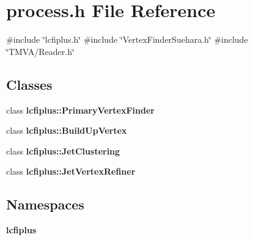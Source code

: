 \section{process.\+h File Reference}
\label{process_8h}
{\ttfamily \#include \char`\"{}lcfiplus.\+h\char`\"{}}\newline
{\ttfamily \#include \char`\"{}Vertex\+Finder\+Suehara.\+h\char`\"{}}\newline
{\ttfamily \#include \char`\"{}T\+M\+V\+A/\+Reader.\+h\char`\"{}}\newline
\subsection*{Classes}
\begin{DoxyCompactItemize}
\item 
class \textbf{ lcfiplus\+::\+Primary\+Vertex\+Finder}
\item 
class \textbf{ lcfiplus\+::\+Build\+Up\+Vertex}
\item 
class \textbf{ lcfiplus\+::\+Jet\+Clustering}
\item 
class \textbf{ lcfiplus\+::\+Jet\+Vertex\+Refiner}
\end{DoxyCompactItemize}
\subsection*{Namespaces}
\begin{DoxyCompactItemize}
\item 
 \textbf{ lcfiplus}
\end{DoxyCompactItemize}
